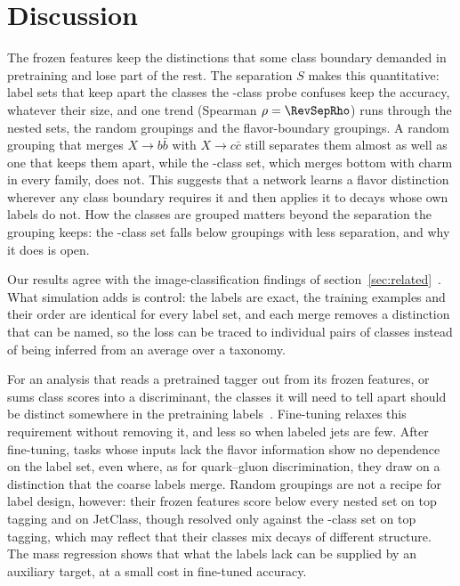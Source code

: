 \section{Discussion}\label{sec:discussion}

The frozen features keep the distinctions that some class boundary demanded in pretraining and lose part of the rest.
The separation $S$ makes this quantitative: label sets that keep apart the classes the \Kfull-class probe confuses keep
the accuracy, whatever their size, and one trend (Spearman $\rho=\RevSepRho$) runs through the nested sets, the random
groupings and the flavor-boundary groupings.
A random grouping that merges $X\to b\bar b$ with $X\to c\bar c$ still separates them almost as well as one that keeps
them apart, while the \Kcoarse-class set, which merges bottom with charm in every family, does not.
This suggests that a network learns a flavor distinction wherever any class boundary requires it and then applies it
to decays whose own labels do not.
How the classes are grouped matters beyond the separation the grouping keeps: the \Kmid-class set falls below
groupings with less separation, and why it does is open.

Our results agree with the image-classification findings of section~\ref{sec:related}~\cite{hong,yang}.
What simulation adds is control: the labels are exact, the training examples and their order are identical for every
label set, and each merge removes a distinction that can be named, so the loss can be traced to individual pairs of
classes instead of being inferred from an average over a taxonomy.

For an analysis that reads a pretrained tagger out from its frozen features, or sums class scores into a
discriminant, the classes it will need to tell apart should be distinct somewhere in the pretraining
labels~\cite{mahajan}.
Fine-tuning relaxes this requirement without removing it, and less so when labeled jets are few.
After fine-tuning, tasks whose inputs lack the flavor information show no dependence on the label set, even where, as
for quark--gluon discrimination, they draw on a distinction that the coarse labels merge.
Random groupings are not a recipe for label design, however: their frozen features score below every nested set on top
tagging and on JetClass, though resolved only against the \Kcoarse-class set on top tagging, which may reflect that
their classes mix decays of different structure.
The mass regression shows that what the labels lack can be supplied by an auxiliary target, at a small cost in
fine-tuned accuracy.

